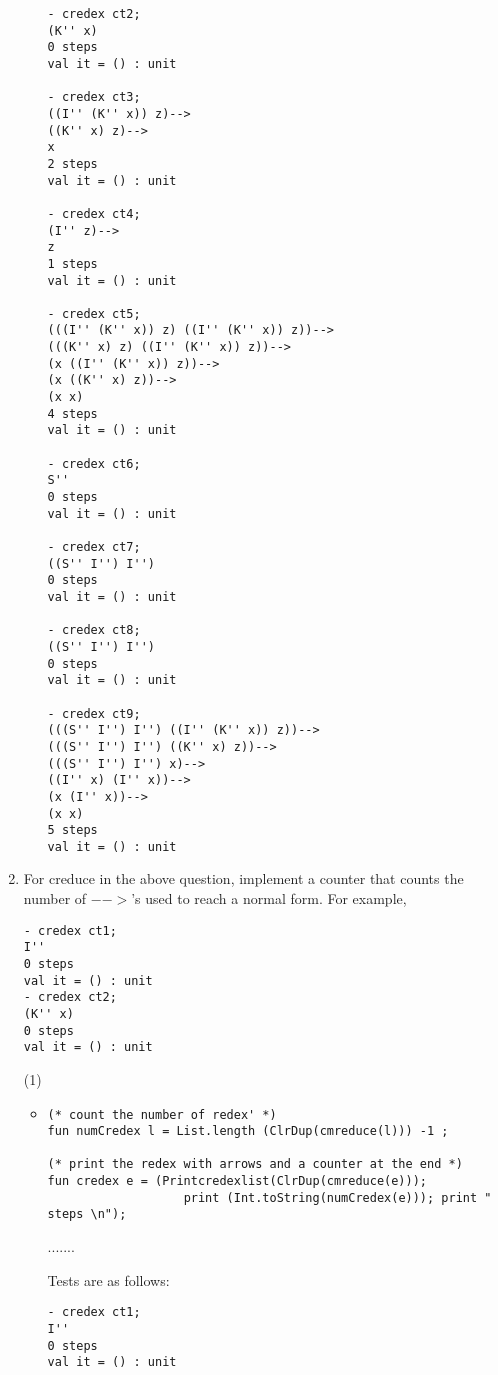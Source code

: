 \documentclass[11pt]{article}
\begin{document}
\begin{enumerate}
\begin{itemize}
\begin{verbatim}
- credex ct2;
(K'' x)
0 steps
val it = () : unit

- credex ct3;
((I'' (K'' x)) z)-->
((K'' x) z)-->
x
2 steps
val it = () : unit

- credex ct4;
(I'' z)-->
z
1 steps
val it = () : unit

- credex ct5;
(((I'' (K'' x)) z) ((I'' (K'' x)) z))-->
(((K'' x) z) ((I'' (K'' x)) z))-->
(x ((I'' (K'' x)) z))-->
(x ((K'' x) z))-->
(x x)
4 steps
val it = () : unit

- credex ct6;
S''
0 steps
val it = () : unit

- credex ct7;
((S'' I'') I'')
0 steps
val it = () : unit

- credex ct8;
((S'' I'') I'')
0 steps
val it = () : unit

- credex ct9;
(((S'' I'') I'') ((I'' (K'' x)) z))-->
(((S'' I'') I'') ((K'' x) z))-->
(((S'' I'') I'') x)-->
((I'' x) (I'' x))-->
(x (I'' x))-->
(x x)
5 steps
val it = () : unit

	      	      \end{verbatim}
	      	      
	      \end{itemize}
	      
	      \color{black}
	\item
	      For creduce in the above question, implement a counter that counts the number of $-->$'s used to reach a normal form.  For example, 
	      \begin{verbatim}
- credex ct1;
I''
0 steps
val it = () : unit
- credex ct2;
(K'' x)
0 steps
val it = () : unit

	      \end{verbatim}
	      \hfill{(1)} %
	      
	      \color{red}
	      \begin{itemize}
	      	\item
	      	      \begin{verbatim}
(* count the number of redex' *)
fun numCredex l = List.length (ClrDup(cmreduce(l))) -1 ;

(* print the redex with arrows and a counter at the end *)
fun	credex e = (Printcredexlist(ClrDup(cmreduce(e))); 
                   print (Int.toString(numCredex(e))); print " steps \n");
	      	      \end{verbatim}
	      	      .......
	      	      
	      	      Tests are as follows:
	      	      \begin{verbatim}
- credex ct1;
I''
0 steps
val it = () : unit


\end{verbatim}
\end{itemize}
\end{enumerate}
\end{document}
